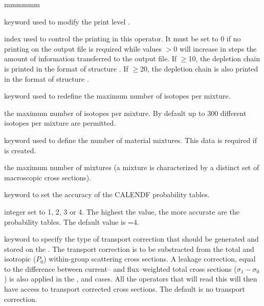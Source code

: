 \begin{ListeDeDescription}{mmmmmm}

\item[\moc{EDIT}] keyword used to modify the print level .

\item[\dusa{iprint}] index used to control the printing in this operator. It
must be set to 0 if no printing on the output file is required while values
$>$0 will increase in steps the amount of information transferred to the output
file. If $\ge$10, the depletion chain is printed in the format of
structure . If $\ge$20, the depletion chain is also
printed in the format of structure .

\item[\moc{MXIS}] keyword used to redefine the maximum number of isotopes per
mixture.  

\item[\dusa{nmisot}] the maximum number of isotopes per
mixture. By default up to 300 different isotopes per mixture are permitted.

\item[\moc{NMIX}] keyword used to define the number of material mixtures. This
data is required if  is created.

\item[\dusa{nmixt}] the maximum number of mixtures (a mixture
is characterized by a distinct set of macroscopic cross sections). 

\item[\moc{CALENDF}] keyword to set the accuracy of the CALENDF probability
tables.

\item[\dusa{ipreci}] integer set to 1, 2, 3 or 4. The highest the value, the
more accurate are the probability tables. The default value is =4.

\item[\moc{CTRA}] keyword to specify the type of transport correction that
should be generated and stored on the . The transport correction is to be
substracted from the total and isotropic ($P_0$) within-group scattering cross sections. A leakage correction, equal 
to the difference between current-- and flux--weighted total cross sections ($\sigma_{1}-\sigma_{0}$)
is also applied in the ,  and  cases. All the operators that
will read this  will then have access to transport corrected
cross sections. The default is no transport correction.


\end{ListeDeDescription}
